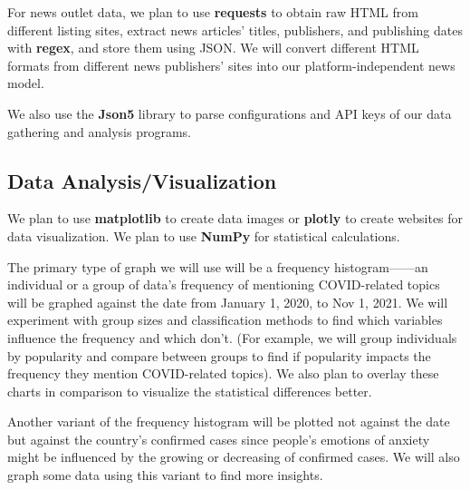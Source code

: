 \documentclass[fontsize=11pt]{article}
\begin{document}
    For news outlet data, we plan to use \textbf{requests} to obtain raw HTML from different listing sites, extract news articles’ titles, publishers, and publishing dates with \textbf{regex}, and store them using JSON. We will convert different HTML formats from different news publishers’ sites into our platform-independent news model.

    We also use the \textbf{Json5} library to parse configurations and API keys of our data gathering and analysis programs.

    \subsection*{Data Analysis/Visualization}

    \indent

    We plan to use \textbf{matplotlib} to create data images or \textbf{plotly} to create websites for data visualization. We plan to use \textbf{NumPy} for statistical calculations.

    The primary type of graph we will use will be a frequency histogram——an individual or a group of data’s frequency of mentioning COVID-related topics will be graphed against the date from January 1, 2020, to Nov 1, 2021. We will experiment with group sizes and classification methods to find which variables influence the frequency and which don’t. (For example, we will group individuals by popularity and compare between groups to find if popularity impacts the frequency they mention COVID-related topics). We also plan to overlay these charts in comparison to visualize the statistical differences better.

    Another variant of the frequency histogram will be plotted not against the date but against the country’s confirmed cases since people’s emotions of anxiety might be influenced by the growing or decreasing of confirmed cases. We will also graph some data using this variant to find more insights.


    \nocite{*}
    \printbibliography
\end{document}
